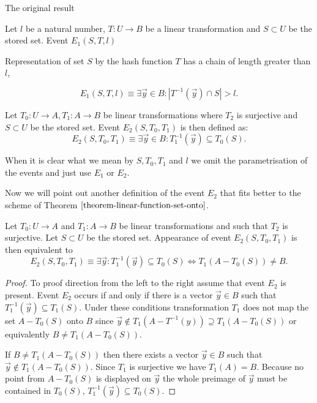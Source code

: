 \begin{section}{The original result}
\begin{definition}
Let $l$ be a natural number, $T: U \rightarrow B$ be a linear transformation and $S \subset U$ be the stored set. Event $E_1(S, T, l)$

\noindent Representation of set $S$ by the hash function $T$ has a chain of length greater than $l$,

\[ 
	E_1(S, T, l) \equiv \exists \vec{y} \in B: | T^{-1}(\vec{y}) \cap S | > l \text{.}
\]
\end{definition}

\begin{definition}
Let $T_0: U \rightarrow A, T_1: A \rightarrow B$ be linear transformations where $T_2$ is surjective and $S \subset U$ be the stored set. Event $E_2(S, T_0, T_1)$ is then defined as:
\[
	E_2(S, T_0, T_1) \equiv \exists \vec{y} \in B: T_1^{-1}(\vec{y}) \subseteq T_0(S) \text{.}
\]
\end{definition}

When it is clear what we mean by $S, T_0, T_1$ and $l$ we omit the parametrisation of the events and just use $E_1$ or $E_2$.

Now we will point out another definition of the event $E_2$ that fits better to the scheme of Theorem $\ref{theorem-linear-function-set-onto}$.
\begin{remark}
\label{remark-e2-equivalency}
Let $T_0: U \rightarrow A$ and $T_1: A \rightarrow B$ be linear transformations and such that $T_2$ is surjective. Let $S \subset U$ be the stored set. Appearance of event $E_2(S, T_0, T_1)$ is then equivalent to
\[
	E_2(S, T_0, T_1) \equiv \exists \vec{y}: T_1^{-1}(\vec{y}) \subseteq T_0(S) \Leftrightarrow T_1(A - T_0(S)) \neq B \text{.}
\]
\end{remark}
\begin{proof}
To proof direction from the left to the right assume that event $E_2$ is present. Event $E_2$ occurs if and only if there is a vector $\vec{y} \in B$ such that $T_1^{-1}(\vec{y}) \subseteq T_1(S)$. Under these conditions transformation $T_1$ does not map the set $A - T_0(S)$ onto $B$ since $\vec{y} \notin T_1(A - T^{-1}(y)) \supseteq T_1(A - T_0(S))$ or equivalently $B \neq T_1(A - T_0(S))$.

If $B \neq T_1(A - T_0(S))$ then there exists a vector $\vec{y} \in B$ such that $\vec{y} \notin T_1(A - T_0(S))$. Since $T_1$ is surjective we have $T_1(A) = B$. Because no point from $A - T_0(S)$ is displayed on $\vec{y}$ the whole preimage of $\vec{y}$ must be contained in $T_0(S)$, $T_1^{-1}(\vec{y}) \subseteq T_0(S)$.


\end{proof}
\end{section}

